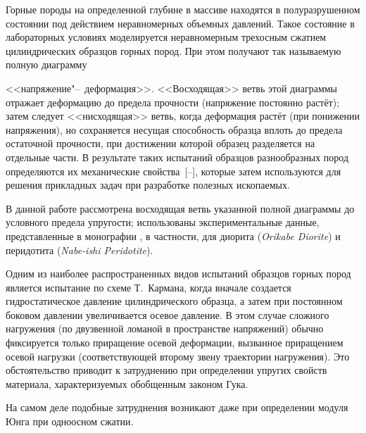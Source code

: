 
\renewcommand{\JournalDataOnline}{\displaydate{komartse}}




\makerutitle








Горные породы на определенной глубине в массиве находятся в полуразрушенном состоянии под действием неравномерных объемных давлений. Такое состояние в лабораторных условиях моделируется неравномерным трехосным сжатием цилиндрических образцов горных пород. При этом получают так называемую полную диаграмму

<<напряжение"--~деформация>>. <<Восходящая>> ветвь этой диаграммы отражает деформацию до предела прочности (напряжение постоянно растёт);  затем следует <<нисходящая>> ветвь, когда деформация растёт (при понижении напряжения), но сохраняется несущая способность образца вплоть до предела остаточной прочности, при достижении которой образец разделяется на отдельные части. В результате таких испытаний образцов разнообразных пород определяются их механические свойства~[--], которые затем используются для решения прикладных задач при разработке полезных ископаемых.

В данной работе рассмотрена восходящая ветвь указанной полной диаграммы до условного предела упругости; использованы экспериментальные данные, представленные в монографии \cite{ulg:bib:Mogi}, в частности, для диорита ({\it Orikabe Diorite}\/) и перидотита ({\it Nabe-ishi Peridotite}\/).



Одним из наиболее распространенных видов испытаний образцов горных пород является испытание по схеме Т.~Кармана, когда вначале создается гидростатическое давление цилиндрического образца, а затем при постоянном боковом давлении увеличивается осевое давление. В этом случае сложного нагружения (по двузвенной ломаной в пространстве напряжений) обычно фиксируется только приращение осевой деформации, вызванное приращением осевой нагрузки (соответствующей второму звену траектории нагружения). Это обстоятельство приводит к затруднению при определении упругих свойств материала, характеризуемых обобщенным законом Гука. 

На самом деле подобные затруднения возникают даже при определении модуля Юнга при одноосном сжатии. 

